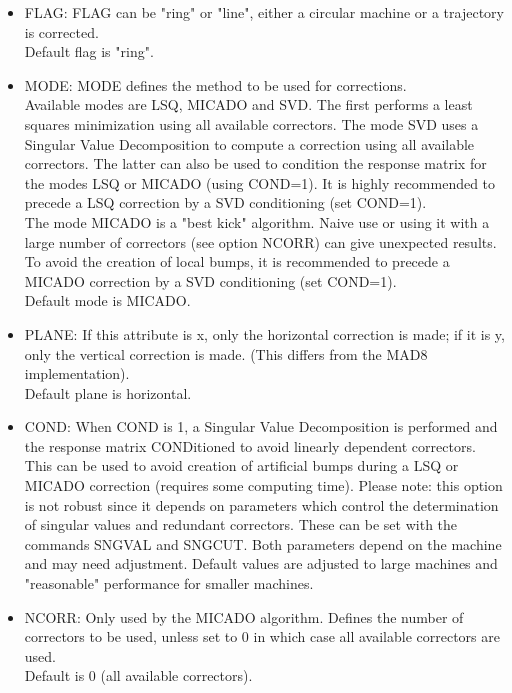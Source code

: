 \begin{itemize}
   \item FLAG: FLAG can be "ring" or "line", either a circular machine
     or a trajectory is corrected.   
     \\ Default flag is "ring". 

   \item MODE: MODE defines the method to be used for corrections. 
     \\ Available modes are LSQ, MICADO and SVD.  The first performs a
     least squares minimization using all available correctors. The mode
     SVD uses a Singular Value Decomposition to compute a correction
     using all available correctors. The latter can also be used to
     condition the response matrix for the modes LSQ or MICADO (using
     COND=1). It is highly recommended to precede a LSQ correction by a
     SVD conditioning (set COND=1).  
     \\ The mode MICADO is a "best kick" algorithm. Naive use or using
     it with a large number of correctors (see option NCORR) can give
     unexpected results. To avoid the creation of local bumps, it is
     recommended to precede a MICADO correction by a SVD conditioning
     (set COND=1).  
     \\ Default mode is MICADO.            

   \item PLANE: If this attribute is x, only the horizontal correction
     is made; if it is y, only the vertical correction is made. (This
     differs from the MAD8 implementation).  
     \\ Default plane is horizontal. 

   \item COND: When COND is 1, a Singular Value Decomposition is
     performed and  the response matrix CONDitioned to avoid linearly
     dependent correctors. This can be used to avoid creation of
     artificial bumps during a LSQ or MICADO correction (requires some
     computing time).  Please note: this option is not robust since it
     depends on parameters which control the determination of singular
     values and redundant correctors. These can be set with the commands
     SNGVAL and SNGCUT. Both parameters depend on the machine and may
     need adjustment. Default values are adjusted to large machines and
     "reasonable" performance for smaller machines.  
     \\

   \item NCORR: Only used by the MICADO algorithm. Defines the number of
     correctors to be used, unless set to 0 in which case all available
     correctors are used.  
     \\ Default is 0 (all available correctors). 


\end{itemize}
